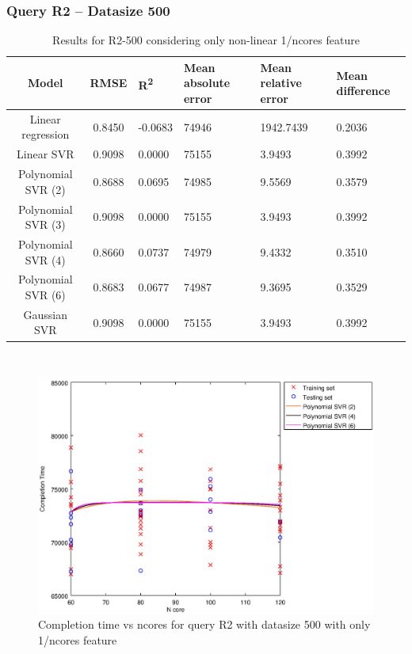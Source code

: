 \documentclass[a4paper,11pt]{article}
\begin{document}
\newpage
\subsubsection{Query R2 -- Datasize 500}
\begin{table}[H]
	\centering
	\begin{adjustbox}{center}
		\begin{tabular}{c | c M{1.2cm} M{2.5cm} M{2.5cm} M{1.8cm}}
			Model & RMSE & R\textsuperscript{2} & Mean absolute error & Mean relative error & Mean difference \tabularnewline
			\hline
			Linear regression & 0.8450 & -0.0683 &  74946 & 1942.7439 & 0.2036 \\
			Linear SVR & 0.9098 & 0.0000 &  75155 & 3.9493 & 0.3992 \\
			Polynomial SVR (2) & 0.8688 & 0.0695 &  74985 & 9.5569 & 0.3579 \\
			Polynomial SVR (3) & 0.9098 & 0.0000 &  75155 & 3.9493 & 0.3992 \\
			Polynomial SVR (4) & 0.8660 & 0.0737 &  74979 & 9.4332 & 0.3510 \\
			Polynomial SVR (6) & 0.8683 & 0.0677 &  74987 & 9.3695 & 0.3529 \\
			Gaussian SVR & 0.9098 & 0.0000 &  75155 & 3.9493 & 0.3992 \\
		\end{tabular}
	\end{adjustbox}
	\\
	\caption{Results for R2-500 considering only non-linear 1/ncores feature}
	\label{table_R2_prediction_all}
\end{table}

\begin {figure}[hbtp]
\centering
\includegraphics[width=\textwidth]{output/R2_500_ONLY_1_OVER_NCORES/plot_R2_500_bestmodels.eps}
\caption {Completion time vs ncores for query R2 with datasize 500 with only 1/ncores feature}
\end {figure}
\end{document}
